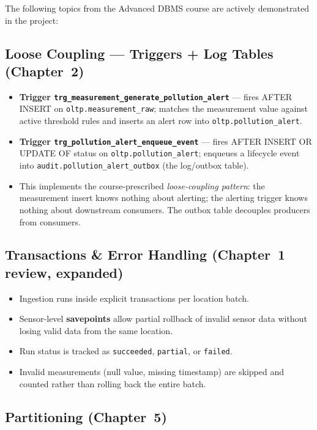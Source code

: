 \documentclass[11pt,a4paper]{article}
\begin{document}
The following topics from the Advanced DBMS course are actively demonstrated in the project:

\subsection{Loose Coupling --- Triggers + Log Tables (Chapter~2)}

\begin{itemize}[nosep]
  \item \textbf{Trigger \texttt{trg\_measurement\_generate\_pollution\_alert}} --- fires AFTER INSERT on \texttt{oltp.measurement\_raw}; matches the measurement value against active threshold rules and inserts an alert row into \texttt{oltp.pollution\_alert}.
  \item \textbf{Trigger \texttt{trg\_pollution\_alert\_enqueue\_event}} --- fires AFTER INSERT OR UPDATE OF status on \texttt{oltp.pollution\_alert}; enqueues a lifecycle event into \texttt{audit.pollution\_alert\_outbox} (the log/outbox table).
  \item This implements the course-prescribed \emph{loose-coupling pattern}: the measurement insert knows nothing about alerting; the alerting trigger knows nothing about downstream consumers. The outbox table decouples producers from consumers.
\end{itemize}

\subsection{Transactions \& Error Handling (Chapter~1 review, expanded)}

\begin{itemize}[nosep]
  \item Ingestion runs inside explicit transactions per location batch.
  \item Sensor-level \textbf{savepoints} allow partial rollback of invalid sensor data without losing valid data from the same location.
  \item Run status is tracked as \texttt{succeeded}, \texttt{partial}, or \texttt{failed}.
  \item Invalid measurements (null value, missing timestamp) are skipped and counted rather than rolling back the entire batch.
\end{itemize}

\subsection{Partitioning (Chapter~5)}
\end{document}
